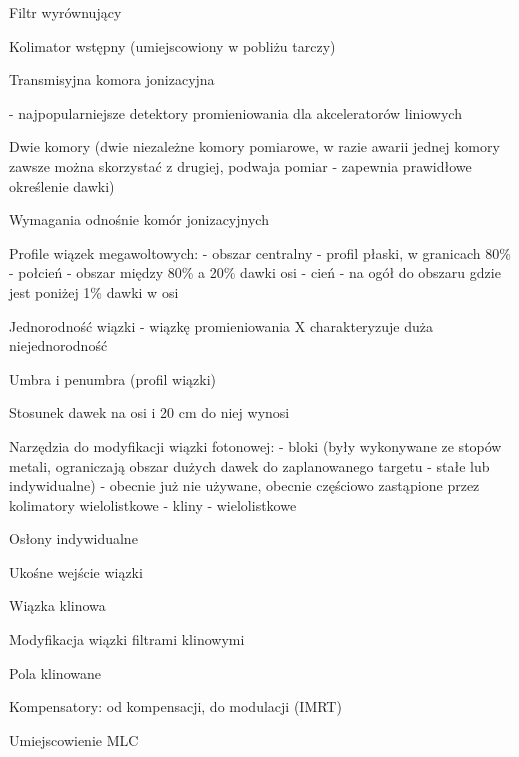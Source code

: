 \documentclass{article}
\begin{document}
Filtr wyrównujący

Kolimator wstępny (umiejscowiony w pobliżu tarczy)

Transmisyjna komora jonizacyjna

- najpopularniejsze detektory promieniowania dla akceleratorów liniowych

Dwie komory (dwie niezależne komory pomiarowe, w razie awarii jednej komory zawsze można skorzystać z drugiej, podwaja pomiar - zapewnia prawidłowe określenie dawki)

Wymagania odnośnie komór jonizacyjnych

Profile wiązek megawoltowych:
- obszar centralny - profil płaski, w granicach 80\%
- połcień - obszar między 80\% a 20\% dawki osi
- cień - na ogół do obszaru gdzie jest poniżej 1\% dawki w osi

Jednorodność wiązki - wiązkę promieniowania X charakteryzuje duża niejednorodność

Umbra i penumbra (profil wiązki)

Stosunek dawek na osi i 20 cm do niej wynosi

Narzędzia do modyfikacji wiązki fotonowej:
- bloki (były wykonywane ze stopów metali, ograniczają obszar dużych dawek do zaplanowanego targetu - stałe lub indywidualne) - obecnie już nie używane, obecnie częściowo zastąpione przez kolimatory wielolistkowe
- kliny
- wielolistkowe

Osłony indywidualne

Ukośne wejście wiązki

Wiązka klinowa

Modyfikacja wiązki filtrami klinowymi

Pola klinowane

Kompensatory: od kompensacji, do modulacji (IMRT)

Umiejscowienie MLC
\end{document}
